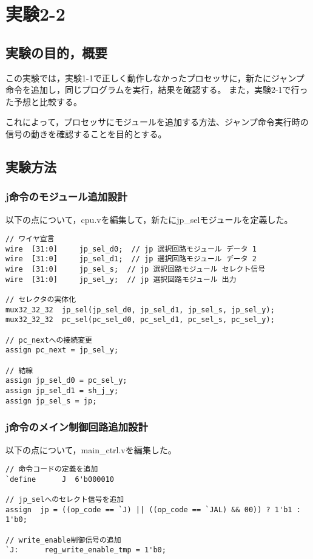 \section{実験2-2}
\subsection{実験の目的，概要}
この実験では，実験1-1で正しく動作しなかったプロセッサに，新たにジャンプ命令を追加し，同じプログラムを実行，結果を確認する。
また，実験2-1で行った予想と比較する。

これによって，プロセッサにモジュールを追加する方法、ジャンプ命令実行時の信号の動きを確認することを目的とする。

\subsection{実験方法}
\subsubsection{j命令のモジュール追加設計}
以下の点について，cpu.vを編集して，新たにjp\_selモジュールを定義した。
\begin{lstlisting}[caption={addiu命令の追加設計},label={addiu命令の追加設計}]
// ワイヤ宣言
wire  [31:0]     jp_sel_d0;  // jp 選択回路モジュール データ 1
wire  [31:0]     jp_sel_d1;  // jp 選択回路モジュール データ 2
wire  [31:0]     jp_sel_s;  // jp 選択回路モジュール セレクト信号
wire  [31:0]     jp_sel_y;  // jp 選択回路モジュール 出力

// セレクタの実体化
mux32_32_32  jp_sel(jp_sel_d0, jp_sel_d1, jp_sel_s, jp_sel_y);
mux32_32_32  pc_sel(pc_sel_d0, pc_sel_d1, pc_sel_s, pc_sel_y);

// pc_nextへの接続変更
assign pc_next = jp_sel_y;

// 結線
assign jp_sel_d0 = pc_sel_y;
assign jp_sel_d1 = sh_j_y;
assign jp_sel_s = jp;
\end{lstlisting}

\subsubsection{j命令のメイン制御回路追加設計}
以下の点について，main\_ctrl.vを編集した。
\begin{lstlisting}[caption={sw命令の追加設計},label={sw命令の追加設計}]
// 命令コードの定義を追加
`define  	 J  6'b000010

// jp_selへのセレクト信号を追加
assign  jp = ((op_code == `J) || ((op_code == `JAL) && 00)) ? 1'b1 : 1'b0;

// write_enable制御信号の追加
`J:      reg_write_enable_tmp = 1'b0;
\end{lstlisting}

